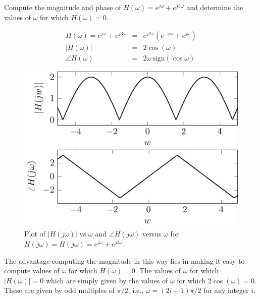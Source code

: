 \begin{example}
Compute the magnitude and phase of $H(\omega) = e^{j \omega} + e^{j 3 \omega}$ and determine the values of $\omega$ for which $H(\omega) = 0$.

\begin{eqnarray}
  H(\omega) = e^{j \omega} + e^{j 3 \omega} &=& e^{j 2 \omega} \left(e^{-j \omega} + e^{j \omega} \right) \\
  |H(\omega)| &=& 2 \cos \left( \omega \right) \\
  \angle H(\omega) &=& 2 \omega \ \text{sign}(\cos \omega)
\end{eqnarray}
\end{example}
\begin{figure}[htbp]
\begin{center}\includegraphics{../Images/ComplexNumbers/Fig_0_8.pdf}\end{center}
\caption{Plot of $|H(j \omega)|$ vs $\omega$ and $\angle H(j \omega)$ versus $\omega$ for $H(j \omega) = H(j \omega) = e^{j \omega} + e^{j 3 \omega}$.}
\label{fig:Xomegaexample3}
\end{figure}

The advantage computing the magnitude in this way lies in making it easy to compute values of $\omega$ for which $H(\omega)=0$.
The values of $\omega$ for which $|H(\omega)|=0$ which are simply given by the values of $\omega$ for which $2 \cos(\omega) = 0$. These are given by odd multiples of $\pi/2$, i.e., $\omega = (2i+1) \pi/2$ for any integer $i$.

